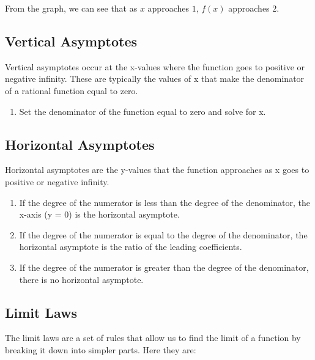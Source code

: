 \documentclass{article}
\begin{document}
From the graph, we can see that as $x$ approaches $1$, $f(x)$ approaches $2$.

\subsection{Vertical Asymptotes}
Vertical asymptotes occur at the x-values where the function goes to positive or negative infinity. These are typically the values of x that make the denominator of a rational function equal to zero.

\begin{enumerate}
\item Set the denominator of the function equal to zero and solve for x.
\end{enumerate}
    
\subsection{Horizontal Asymptotes}
    
Horizontal asymptotes are the y-values that the function approaches as x goes to positive or negative infinity.

\begin{enumerate}
\item If the degree of the numerator is less than the degree of the denominator, the x-axis (y = 0) is the horizontal asymptote.
\item If the degree of the numerator is equal to the degree of the denominator, the horizontal asymptote is the ratio of the leading coefficients.
\item If the degree of the numerator is greater than the degree of the denominator, there is no horizontal asymptote.
\end{enumerate}

\subsection{Limit Laws}

The limit laws are a set of rules that allow us to find the limit of a function by breaking it down into simpler parts. Here they are:
\end{document}
